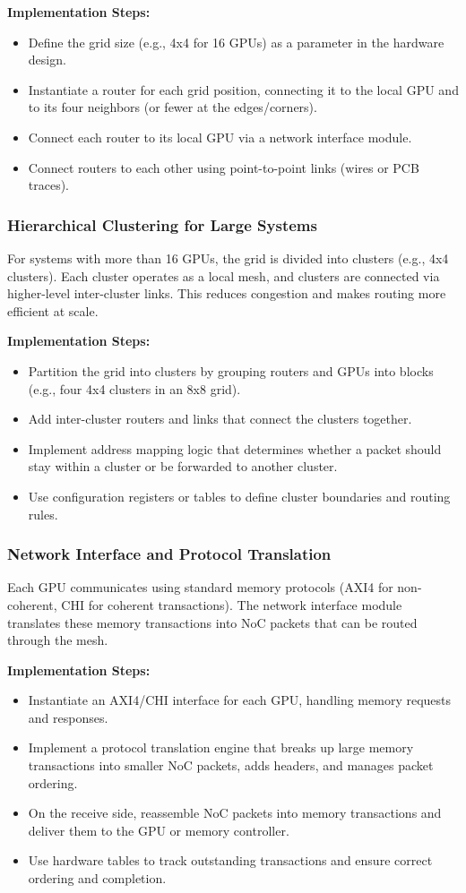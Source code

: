\documentclass[11pt,a4paper]{article}
\begin{document}
\textbf{Implementation Steps:}
\begin{itemize}
    \item Define the grid size (e.g., 4x4 for 16 GPUs) as a parameter in the hardware design.
    \item Instantiate a router for each grid position, connecting it to the local GPU and to its four neighbors (or fewer at the edges/corners).
    \item Connect each router to its local GPU via a network interface module.
    \item Connect routers to each other using point-to-point links (wires or PCB traces).
\end{itemize}

\subsubsection{Hierarchical Clustering for Large Systems}
For systems with more than 16 GPUs, the grid is divided into clusters (e.g., 4x4 clusters). Each cluster operates as a local mesh, and clusters are connected via higher-level inter-cluster links. This reduces congestion and makes routing more efficient at scale.

\textbf{Implementation Steps:}
\begin{itemize}
    \item Partition the grid into clusters by grouping routers and GPUs into blocks (e.g., four 4x4 clusters in an 8x8 grid).
    \item Add inter-cluster routers and links that connect the clusters together.
    \item Implement address mapping logic that determines whether a packet should stay within a cluster or be forwarded to another cluster.
    \item Use configuration registers or tables to define cluster boundaries and routing rules.
\end{itemize}

\subsubsection{Network Interface and Protocol Translation}
Each GPU communicates using standard memory protocols (AXI4 for non-coherent, CHI for coherent transactions). The network interface module translates these memory transactions into NoC packets that can be routed through the mesh.

\textbf{Implementation Steps:}
\begin{itemize}
    \item Instantiate an AXI4/CHI interface for each GPU, handling memory requests and responses.
    \item Implement a protocol translation engine that breaks up large memory transactions into smaller NoC packets, adds headers, and manages packet ordering.
    \item On the receive side, reassemble NoC packets into memory transactions and deliver them to the GPU or memory controller.
    \item Use hardware tables to track outstanding transactions and ensure correct ordering and completion.
\end{itemize}
\end{document}
